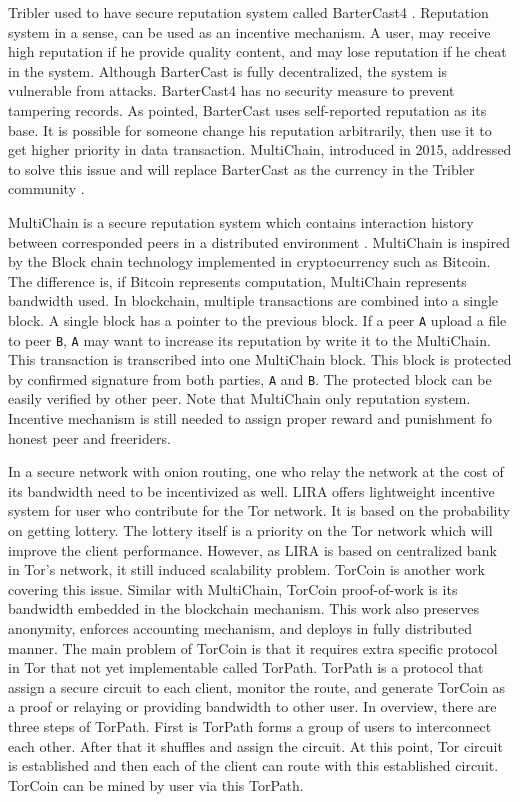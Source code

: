 Tribler used to have secure reputation system called BarterCast4 \cite{2009:bartercast:meulpolder}. Reputation system in a sense, can be used as an incentive mechanism. A user, may receive high reputation if he provide quality content, and may lose reputation if he cheat in the system. Although BarterCast is fully decentralized, the system is vulnerable from attacks. BarterCast4 has no security measure to prevent tampering records. As \citeauthor{2015:multichain:norberhuis} pointed, BarterCast uses self-reported reputation as its base. It is possible for someone change his reputation arbitrarily, then use it to get higher priority in data transaction. MultiChain, introduced in 2015, addressed to solve this issue and will replace BarterCast as the currency in the Tribler community \cite{2015:multichain:norberhuis}. 

MultiChain is a secure reputation system which contains interaction history between corresponded peers in a distributed environment \cite{2015:multichain:norberhuis}. MultiChain is inspired by the Block chain technology implemented in cryptocurrency such as Bitcoin. The difference is, if Bitcoin represents computation, MultiChain represents bandwidth used. In blockchain, multiple transactions are combined into a single block. A single block has a pointer to the previous block. If a peer \texttt{A} upload a file to peer \texttt{B}, \texttt{A} may want to increase its reputation by write it to the MultiChain. This transaction is transcribed into one MultiChain block. This block is protected by confirmed signature from both parties, \texttt{A} and \texttt{B}. The protected block can be easily verified by other peer. Note that MultiChain only reputation system. Incentive mechanism is still needed to assign proper reward and punishment fo honest peer and freeriders.

In a secure network with onion routing, one who relay the network at the cost of its bandwidth need to be incentivized as well. LIRA \cite{2013:lira:jansen} offers lightweight incentive system for user who contribute for the Tor network. It is based on the probability on getting lottery. The lottery itself is a priority on the Tor network which will improve the client performance. However, as LIRA is based on centralized bank in Tor's network, it still induced scalability problem. TorCoin \cite{2014:torcoin:ghosh} is another work covering this issue. Similar with MultiChain, TorCoin proof-of-work is its bandwidth embedded in the blockchain mechanism. This work also preserves anonymity, enforces accounting mechanism, and deploys in fully distributed manner. The main problem of TorCoin is that it requires extra specific protocol in Tor that not yet implementable called TorPath. TorPath is a protocol that assign a secure circuit to each client, monitor the route, and generate TorCoin as a proof or relaying or providing bandwidth to other user. In overview, there are three steps of TorPath. First is TorPath forms a group of users to interconnect each other. After that it shuffles and assign the circuit. At this point, Tor circuit is established and then each of the client can route with this established circuit. TorCoin can be mined by user via this TorPath.

